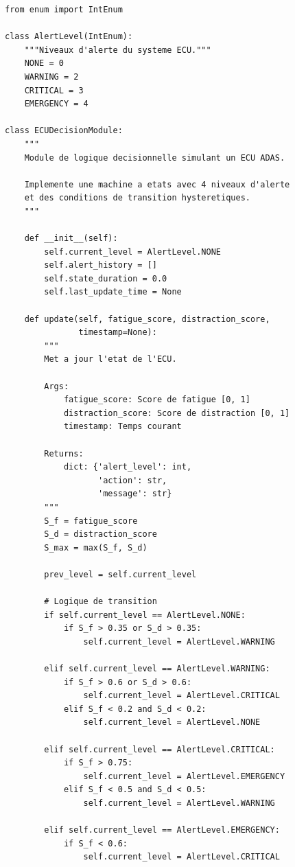 \documentclass[12pt,a4paper,twoside]{report}
\begin{document}
\begin{lstlisting}[style=pythonstyle, caption={Module de logique décisionnelle ECU.}, label={lst:ecu}]
from enum import IntEnum

class AlertLevel(IntEnum):
    """Niveaux d'alerte du systeme ECU."""
    NONE = 0
    WARNING = 2
    CRITICAL = 3
    EMERGENCY = 4

class ECUDecisionModule:
    """
    Module de logique decisionnelle simulant un ECU ADAS.
    
    Implemente une machine a etats avec 4 niveaux d'alerte
    et des conditions de transition hysteretiques.
    """
    
    def __init__(self):
        self.current_level = AlertLevel.NONE
        self.alert_history = []
        self.state_duration = 0.0
        self.last_update_time = None
    
    def update(self, fatigue_score, distraction_score, 
               timestamp=None):
        """
        Met a jour l'etat de l'ECU.
        
        Args:
            fatigue_score: Score de fatigue [0, 1]
            distraction_score: Score de distraction [0, 1]
            timestamp: Temps courant
            
        Returns:
            dict: {'alert_level': int, 
                   'action': str, 
                   'message': str}
        """
        S_f = fatigue_score
        S_d = distraction_score
        S_max = max(S_f, S_d)
        
        prev_level = self.current_level
        
        # Logique de transition
        if self.current_level == AlertLevel.NONE:
            if S_f > 0.35 or S_d > 0.35:
                self.current_level = AlertLevel.WARNING
        
        elif self.current_level == AlertLevel.WARNING:
            if S_f > 0.6 or S_d > 0.6:
                self.current_level = AlertLevel.CRITICAL
            elif S_f < 0.2 and S_d < 0.2:
                self.current_level = AlertLevel.NONE
        
        elif self.current_level == AlertLevel.CRITICAL:
            if S_f > 0.75:
                self.current_level = AlertLevel.EMERGENCY
            elif S_f < 0.5 and S_d < 0.5:
                self.current_level = AlertLevel.WARNING
        
        elif self.current_level == AlertLevel.EMERGENCY:
            if S_f < 0.6:
                self.current_level = AlertLevel.CRITICAL
        

\end{lstlisting}
\end{document}
